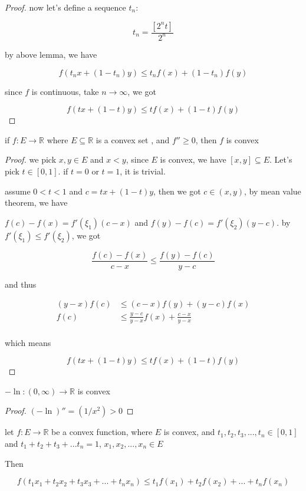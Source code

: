 \documentclass[11pt,a4paper]{article}
\begin{document}
\begin{proof}
    now let's define a sequence $t_n$:

    \[
        t_n = \frac{ [2^n t]}{2^n}
    \]

    by above lemma, we have

    \[
        f(t_nx + (1-t_n)y) \le t_n f(x) + (1-t_n)f(y)
    \]

    since $f$ is continuous, take $n \to \infty$, we got

    \[
        f(tx + (1-t)y) \le t f(x) + (1-t)f(y)
    \]
\end{proof}

\begin{thm}
    if $f: E \to \mathbb{R}$ where $E \subseteq \mathbb{R}$ is a convex set , and $f'' \ge 0$, then $f$ is convex
\end{thm}

\begin{proof}
    we pick $x,y \in E$ and $x<y$, since $E$ is convex, we have $[x,y] \subseteq E$. Let's pick $t \in [0,1]$.
    if $t = 0$ or $t = 1$, it is trivial. 

    assume $0 < t < 1$ and $c = tx + (1-t)y$, then we got $c \in (x,y)$, by mean value theorem, we have

    $f(c) - f(x) = f'(\xi_1)(c-x)$ and $f(y) - f(c) = f'(\xi_2)(y-c)$. by $f'(\xi_1) \le f'(\xi_2)$, we got

    \[
        \frac{f(c) - f(x)}{c-x} \le \frac{f(y) - f(c)}{y-c}
    \]

    and thus

    \begin{align*}
      (y-x) f(c) &\le (c-x)f(y) + (y-c)f(x) \\
       f(c) &\le  \frac{y-c}{y-x}f(x) + \frac{c-x}{y-x} \\
    \end{align*}

    which means

    \[
        f(tx + (1-t)y) \le tf(x) + (1-t)f(y)
    \]
\end{proof}


\begin{corollary}
    $-\ln: (0, \infty) \to \mathbb{R}$ is convex
\end{corollary}

\begin{proof}
    $(-\ln)'' = (1/x^2) >0$
\end{proof}

\begin{thm}
    let $f: E \to \mathbb{R}$ be a convex function, where $E$ is convex, and $t_1,t_2,t_3,...,t_n \in [0,1]$ and $t_1+t_2+t_3+...t_n = 1$, $x_1,x_2,...,x_n \in E$

    Then

    \[
        f(t_1x_1+t_2x_2+t_3x_3 + ... +t_n x_n) \le t_1f(x_1) + t_2f(x_2) + ... + t_nf(x_n)
    \]
\end{thm}
\end{document}
